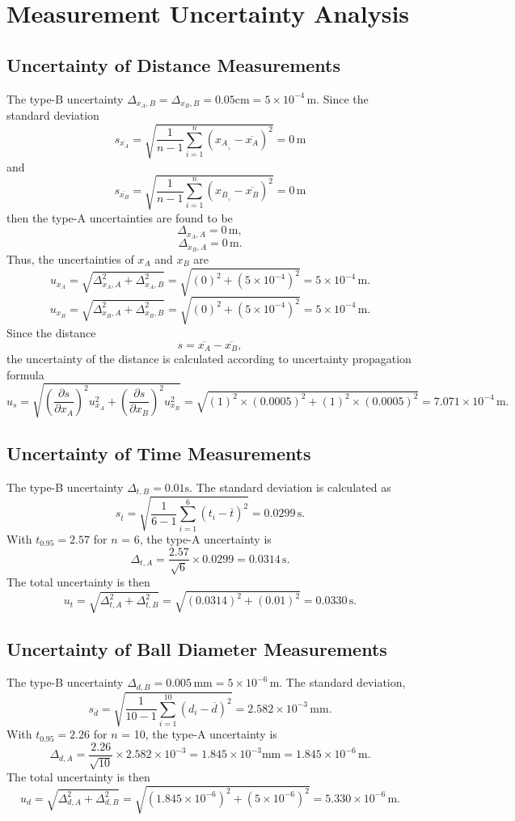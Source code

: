 \documentclass[a4paper]{article}
\begin{document}
\newpage

\appendix

		\section{Measurement Uncertainty Analysis}

	\subsection{Uncertainty of Distance Measurements}
The type-B uncertainty  $\Delta_{x_A,B}= \Delta_{x_B,B} = 0.05 \text{cm} =5 \times 10^{-4} \,\text{m}$. Since the standard deviation
\[s_{\overline{x_A}} =\sqrt{\frac{1}{n-1}\sum \limits_{i=1}^{n}(x_A_,_i-\overline{x_A})^2} = 0\, \text{m}\]
and
\[s_{\overline{x_B}} =\sqrt{\frac{1}{n-1}\sum \limits_{i=1}^{n}(x_B_,_i-\overline{x_B})^2} = 0 \,\text{m}\]
then the type-A uncertainties are found to be
\[\Delta_{x_A,A} = 0\,\text{m},\]
\[\Delta_{x_B,A} = 0\,\text{m}.\]
Thus, the uncertainties of $x_A$ and $x_B$ are
\[u_{x_A} = \sqrt{\Delta_{x_A,A}^2+\Delta_{x_A,B}^2} = \sqrt{(0)^2+(5\times10^{-4})^2} = 5 \times 10^{-4} \,\text{m}.\]
\[u_{x_B} = \sqrt{\Delta_{x_B,A}^2+\Delta_{x_B,B}^2} = \sqrt{(0)^2+(5\times10^{-4})^2} = 5 \times 10^{-4} \,\text{m}.\]
Since the distance \[ s=\overline{x_A}-\overline{x_B},\]
the uncertainty of the distance is calculated according to uncertainty propagation formula
\[u_s = \sqrt{(\frac{\partial s}{\partial x_A})^{2} u_{x_A}^{2}+(\frac{\partial s}{\partial x_B})^{2}  u_{x_B}^{2}} = \sqrt{(1)^2\times(0.0005)^2+(1)^2\times(0.0005)^2} = 7.071 \times 10^{-4} \,\text{m}.\]

	\subsection{Uncertainty of Time Measurements}
The type-B uncertainty $\Delta_{t,B} = 0.01 \text{s}$. The standard deviation is calculated as
$$s_{\overline{t}} =\sqrt{\frac{1}{6-1}\sum \limits_{i=1}^{6}(t_i-\overline{t})^2} = 0.0299 \,\text{s}.$$
With $t_{0.95} = 2.57$ for $n$ = 6, the type-A uncertainty is  
$$\Delta_{t,A} = \frac{2.57}{\sqrt{6}}\times0.0299 = 0.0314 \,\text{s}.$$
The total uncertainty is then
$$u_t = \sqrt{\Delta_{t,A}^2+\Delta_{t,B}^2} = \sqrt{(0.0314)^2+(0.01)^2} = 0.0330 \,\text{s}.$$

	\subsection{Uncertainty of Ball Diameter Measurements}
The type-B uncertainty $\Delta_{d,B} = 0.005\,\text{mm} = 5\times10^{-6}\,\text{m}$. The standard deviation,
$$s_{\overline{d}} =\sqrt{\frac{1}{10-1}\sum \limits_{i=1}^{10}(d_i-\overline{d})^2} = 2.582\times 10^{-3}\,\text{mm}.$$
With $t_{0.95} = 2.26$ for $n$ = 10, the type-A uncertainty is 
$$\Delta_{d,A} = \frac{2.26}{\sqrt{10}}\times2.582\times10^{-3} = 1.845\times10^{-3} \text{mm} = 1.845\times10^{-6} \,\text{m}.$$
The total uncertainty is then
$$u_d = \sqrt{\Delta_{d,A}^2+\Delta_{d,B}^2} = \sqrt{(1.845\times10^{-6})^2+(5\times10^{-6})^2} = 5.330\times10^{-6}\,\text{m}.$$
\end{document}
